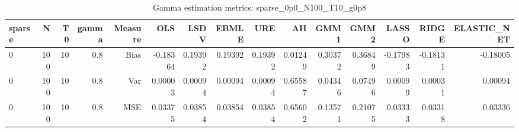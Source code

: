 \begin{table}[!htbp]\centering
\caption{Gamma estimation metrics: sparse_0p0_N100_T10_g0p8}
\label{tab:table1_sparse_0p0_N100_T10_g0p8}
\begin{tabular}{lrrrrrrrrrrrrrr}
\hline
sparse & N & T0 & gamma & Measure & OLS & LSDV & EBMLE & URE & AH & GMM1 & GMM2 & LASSO & RIDGE & ELASTIC_NET \\
\hline
0 & 100 & 10 & 0.8 & Bias & -0.18364 & 0.19392 & 0.19392 & 0.19392 & 0.01249 & 0.30372 & 0.36849 & -0.17983 & -0.18131 & -0.18005 \\
0 & 100 & 10 & 0.8 & Var & 0.00003 & 0.00094 & 0.00094 & 0.00094 & 0.65587 & 0.04346 & 0.07496 & 0.00099 & 0.00031 & 0.00094 \\
0 & 100 & 10 & 0.8 & MSE & 0.03375 & 0.03854 & 0.03854 & 0.03854 & 0.65602 & 0.13571 & 0.21075 & 0.03333 & 0.03318 & 0.03336 \\
\hline
\end{tabular}
\end{table}

